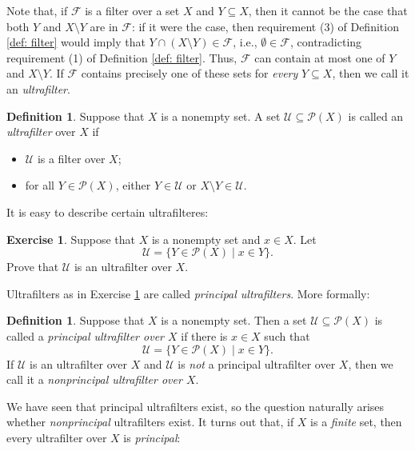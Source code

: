 \documentclass[a4paper]{memoir}
\theoremstyle{definition}
\newtheorem{definition}[theorem]{Definition}
\newtheorem{exercise}[theorem]{Exercise}
\newcommand{\power}{\ensuremath{\mathscr{P}}}
\begin{document}
Note that, if $\mathcal{F}$ is a filter over a set $X$ and $Y \subseteq X$, then it cannot be the case 
that both $Y$ and $X \setminus Y$ are in $\mathcal{F}$: if it were the case, then 
requirement (3) of Definition \ref{def: filter} would imply that 
$Y \cap (X \setminus Y) \in \mathcal{F}$, i.e., $\emptyset \in \mathcal{F}$, contradicting 
requirement (1) of Definition \ref{def: filter}. Thus, $\mathcal{F}$ can contain at most one 
of $Y$ and $X \setminus Y$. If $\mathcal{F}$ contains precisely one of these sets for 
\emph{every} $Y \subseteq X$, then we call it an \emph{ultrafilter}.

\begin{definition}
  Suppose that $X$ is a nonempty set. A set $\mathcal{U} \subseteq \power(X)$ is called 
  an \emph{ultrafilter} over $X$ if 
  \begin{itemize}
    \item $\mathcal{U}$ is a filter over $X$;
    \item for all $Y \in \power(X)$, either $Y \in \mathcal{U}$ or $X \setminus Y \in \mathcal{U}$.
  \end{itemize}
\end{definition}

It is easy to describe certain ultrafilteres:

\begin{exercise} \label{exercise: principal_uf}
  Suppose that $X$ is a nonempty set and $x \in X$. Let 
  \[
    \mathcal{U} = \{Y \in \power(X) \mid x \in Y\}.
  \]
  Prove that $\mathcal{U}$ is an ultrafilter over $X$.
\end{exercise}

Ultrafilters as in Exercise \ref{exercise: principal_uf} are called \emph{principal 
ultrafilters}. More formally:

\begin{definition}
  Suppose that $X$ is a nonempty set. Then a set $\mathcal{U} \subseteq \power(X)$ is called 
  a \emph{principal ultrafilter over $X$} if there is $x \in X$ such that
  \[
    \mathcal{U} = \{Y \in \power(X) \mid x \in Y\}.
  \]
  If $\mathcal{U}$ is an ultrafilter over $X$ and $\mathcal{U}$ is \emph{not} a principal 
  ultrafilter over $X$, then we call it a \emph{nonprincipal ultrafilter over $X$}.
\end{definition}

We have seen that principal ultrafilters exist, so the question naturally arises whether 
\emph{nonprincipal} ultrafilters exist. It turns out that, if $X$ is a \emph{finite} set, 
then every ultrafilter over $X$ is \emph{principal}:
\end{document}
